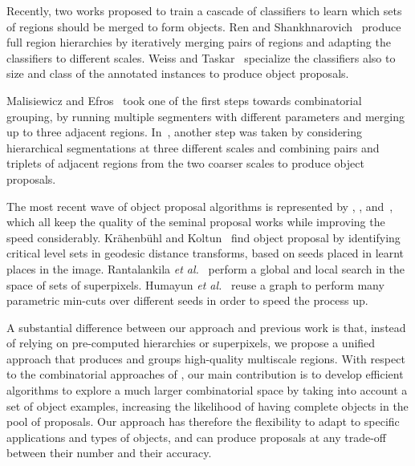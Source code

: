 \documentclass[10pt,journal,cspaper,compsoc]{IEEEtran}
\newcommand*{\etal}{\textit{et al.}\ }
\begin{document}
Recently, two works proposed to train a cascade of classifiers to learn which sets of regions should be merged to form objects.
Ren and Shankhnarovich~\cite{Ren_2013_CVPR} produce full region hierarchies by iteratively merging pairs of regions and adapting the classifiers
to different scales. Weiss and Taskar~\cite{weiss2013scalpel} specialize the classifiers also to size and class of the annotated
instances to produce object proposals.

Malisiewicz and Efros~\cite{Malisiewicz2007} took one of the first steps towards combinatorial grouping, by running multiple segmenters with different parameters and merging up to three adjacent regions.
In~\cite{Arbelaez2012}, another step was taken by considering hierarchical segmentations at three different scales and combining pairs and triplets of adjacent regions from the two coarser scales to produce object proposals.

The most recent wave of object proposal algorithms is represented by \cite{Kraehenbuehl2014}, \cite{Rantalankila2014}, and~\cite{Humayun2014}, which all keep
the quality of the seminal proposal works while improving the speed considerably.
Kr\"ahenb\"uhl and Koltun~\cite{Kraehenbuehl2014} find object proposal by identifying critical level sets in
geodesic distance transforms, based on seeds placed in learnt places in the image.
Rantalankila \etal \cite{Rantalankila2014} perform a global and local search in the space of sets of superpixels.
Humayun \etal \cite{Humayun2014} reuse a graph to perform many parametric min-cuts over different seeds in order to speed the process up.




A substantial difference between our approach and previous work is that, instead of relying on pre-computed hierarchies or superpixels, we propose a unified approach that produces and groups high-quality multiscale regions.
With respect to the combinatorial approaches of \cite{Malisiewicz2007,Arbelaez2012}, our main contribution is to develop efficient algorithms to explore a much larger combinatorial space by taking into account a set of object examples, increasing the likelihood of having complete objects in the pool of proposals. 
Our approach has therefore the flexibility to adapt to specific applications and types of objects, and can produce proposals at any trade-off between their number and their accuracy.
\end{document}
